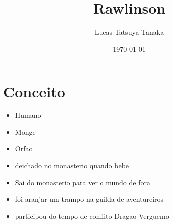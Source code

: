 \documentclass{book}
\title{Rawlinson}
\author{Lucas Tatsuya Tanaka}
\date{\today}
\begin{document}
\maketitle
\tableofcontents

\chapter{Conceito}
\begin{itemize}
    \item Humano 
    \item Monge
    \item Orfao
    \item deichado no monasterio quando bebe
    \item Sai do monasterio para ver o mundo de fora 
    \item foi aranjar um trampo na guilda de aventureiros
    \item participou do tempo de conflito Dragao Verguemo
\end{itemize}
\end{document}
